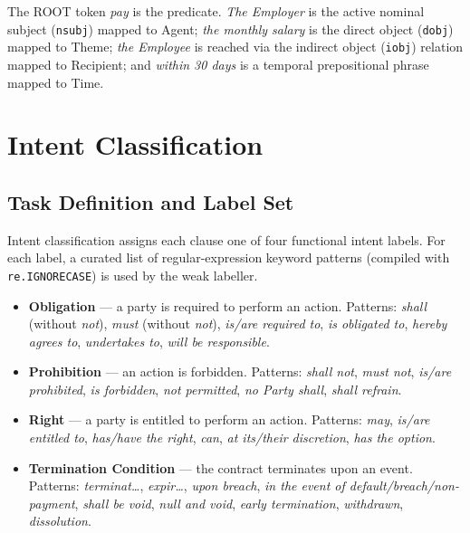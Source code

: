 \documentclass[assignment.tex]{subfiles}
\begin{document}
The ROOT token \textit{pay} is the predicate.  \textit{The Employer} is the active
nominal subject (\texttt{nsubj}) mapped to Agent; \textit{the monthly salary} is the
direct object (\texttt{dobj}) mapped to Theme; \textit{the Employee} is reached via
the indirect object (\texttt{iobj}) relation mapped to Recipient; and
\textit{within 30 days} is a temporal prepositional phrase mapped to Time.

\section{Intent Classification}
\label{subsec:intent}

\subsection{Task Definition and Label Set}

Intent classification assigns each clause one of four functional intent labels.
For each label, a curated list of regular-expression keyword patterns
(compiled with \texttt{re.IGNORECASE}) is used by the weak labeller.

\begin{itemize}[leftmargin=*, itemsep=3pt]
    \item \textbf{Obligation} — a party is required to perform an action.
          Patterns: \textit{shall} (without \textit{not}), \textit{must}
          (without \textit{not}), \textit{is/are required to},
          \textit{is obligated to}, \textit{hereby agrees to},
          \textit{undertakes to}, \textit{will be responsible}.
    \item \textbf{Prohibition} — an action is forbidden.
          Patterns: \textit{shall not}, \textit{must not},
          \textit{is/are prohibited}, \textit{is forbidden},
          \textit{not permitted}, \textit{no Party shall},
          \textit{shall refrain}.
    \item \textbf{Right} — a party is entitled to perform an action.
          Patterns: \textit{may}, \textit{is/are entitled to},
          \textit{has/have the right}, \textit{can},
          \textit{at its/their discretion}, \textit{has the option}.
    \item \textbf{Termination Condition} — the contract terminates upon an event.
          Patterns: \textit{terminat\dots}, \textit{expir\dots},
          \textit{upon breach},
          \textit{in the event of default/breach/non-payment},
          \textit{shall be void}, \textit{null and void},
          \textit{early termination}, \textit{withdrawn},
          \textit{dissolution}.
\end{itemize}
\end{document}
